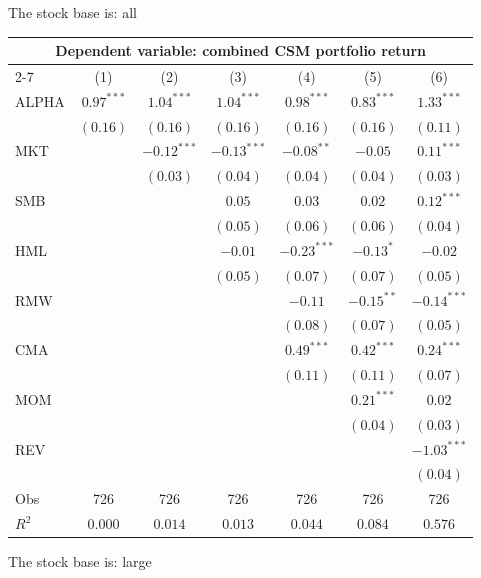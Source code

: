 \documentclass[
]{article}
\author{}
\date{\vspace{-2.5em}}
\begin{document}
The stock base is: all

\begin{tabular}{lcccccc}
  \hline \multicolumn{7}{c}{Dependent variable: combined CSM portfolio return} \\
 \cmidrule(l){2-7} \vspace{5pt}  & (1) & (2) & (3) & (4) & (5) & (6) \\ 
  ALPHA & $0.97^{***}$ & $1.04^{***}$ & $1.04^{***}$ & $0.98^{***}$ & $0.83^{***}$ & $1.33^{***}$ \\ 
   & $(0.16)$ & $(0.16)$ & $(0.16)$ & $(0.16)$ & $(0.16)$ & $(0.11)$ \\ 
  MKT &  & $-0.12^{***}$ & $-0.13^{***}$ & $-0.08^{**}$ & $-0.05$ & $0.11^{***}$ \\ 
   &  & $(0.03)$ & $(0.04)$ & $(0.04)$ & $(0.04)$ & $(0.03)$ \\ 
  SMB &  &  & $0.05$ & $0.03$ & $0.02$ & $0.12^{***}$ \\ 
   &  &  & $(0.05)$ & $(0.06)$ & $(0.06)$ & $(0.04)$ \\ 
  HML &  &  & $-0.01$ & $-0.23^{***}$ & $-0.13^{*}$ & $-0.02$ \\ 
   &  &  & $(0.05)$ & $(0.07)$ & $(0.07)$ & $(0.05)$ \\ 
  RMW &  &  &  & $-0.11$ & $-0.15^{**}$ & $-0.14^{***}$ \\ 
   &  &  &  & $(0.08)$ & $(0.07)$ & $(0.05)$ \\ 
  CMA &  &  &  & $0.49^{***}$ & $0.42^{***}$ & $0.24^{***}$ \\ 
   &  &  &  & $(0.11)$ & $(0.11)$ & $(0.07)$ \\ 
  MOM &  &  &  &  & $0.21^{***}$ & $0.02$ \\ 
   &  &  &  &  & $(0.04)$ & $(0.03)$ \\ 
  REV &  &  &  &  &  & $-1.03^{***}$ \\ 
   \vspace{5pt} &  &  &  &  &  & $(0.04)$ \\ 
  Obs & 726 & 726 & 726 & 726 & 726 & 726 \\ 
  $R^2$ & $0.000$ & $0.014$ & $0.013$ & $0.044$ & $0.084$ & $0.576$ \\ 
   \bottomrule\end{tabular}

The stock base is: large
\end{document}
